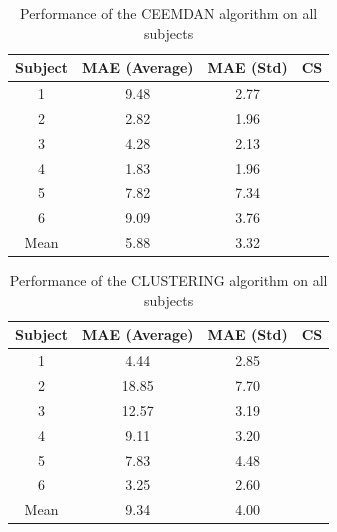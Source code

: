\documentclass[twoside,twocolumn]{article}
\begin{document}
		\begin{table}[ht]
		\centering
		 \begin{tabular}{cccc} 
		 \hline
		 Subject & MAE (Average) & MAE (Std) & CS \\ [0.5ex] 
		 \hline\hline
		 1 & 9.48 & 2.77 &  \\
		 \hline
		 2 & 2.82 & 1.96 &  \\
		 \hline
		 3 & 4.28 & 2.13 &  \\
		 \hline
		 4 & 1.83 & 1.96 &  \\
		 \hline
		 5 & 7.82 & 7.34 &  \\
		 \hline
		 6 & 9.09 & 3.76 &  \\
		 \hline
		 Mean  & 5.88 & 3.32 &  \\
		 \hline
		\end{tabular}
		\label{table:performance_results}
		\caption{Performance of the CEEMDAN algorithm on all subjects}
		\end{table}
		
		\begin{table}[ht]
		\centering
		 \begin{tabular}{cccc} 
		 \hline
		 Subject & MAE (Average) & MAE (Std) & CS \\ [0.5ex] 
		 \hline\hline
		 1 & 4.44 & 2.85 &  \\
		 \hline
		 2 & 18.85 & 7.70 &  \\
		 \hline
		 3 & 12.57 & 3.19 &  \\
		 \hline
		 4 & 9.11 & 3.20 &  \\
		 \hline
		 5 & 7.83 & 4.48 &  \\
		 \hline
		 6 & 3.25 & 2.60 &  \\
		 \hline
		 Mean  & 9.34 & 4.00 &  \\
		 \hline
		\end{tabular}
		\label{table:performance_results}
		\caption{Performance of the CLUSTERING algorithm on all subjects}
		\end{table}
\end{document}
